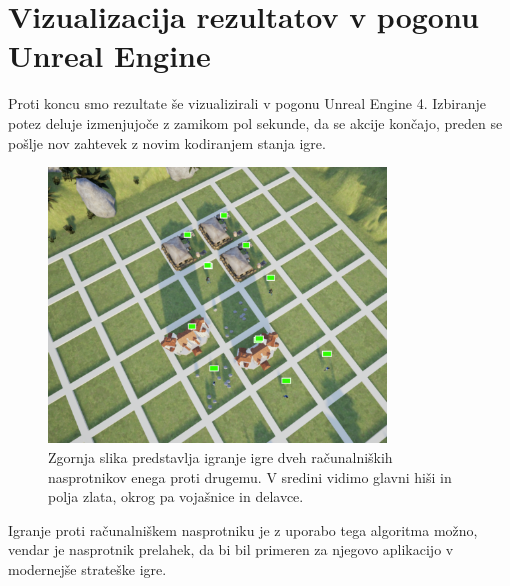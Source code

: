 \documentclass[a4paper, 12pt]{book}
\begin{document}
\section{Vizualizacija rezultatov v pogonu Unreal Engine}
Proti koncu smo rezultate še vizualizirali v pogonu Unreal Engine 4.
Izbiranje potez deluje izmenjujoče z zamikom pol sekunde, da se akcije končajo, preden se pošlje nov zahtevek z novim kodiranjem stanja igre.

\begin{figure}[h]
	\begin{center}
		\includegraphics[width=0.8\textwidth]{photos/visualization_ue4.pdf}
	\end{center}
	\caption{Zgornja slika predstavlja igranje igre dveh računalniških nasprotnikov enega proti drugemu. V sredini vidimo glavni hiši in polja zlata, okrog pa vojašnice in delavce. }
	\label{visualization_ue4}
\end{figure}

Igranje proti računalniškem nasprotniku je z uporabo tega algoritma možno, vendar je nasprotnik prelahek, da bi bil primeren za njegovo aplikacijo v modernejše strateške igre.

\end{document}
